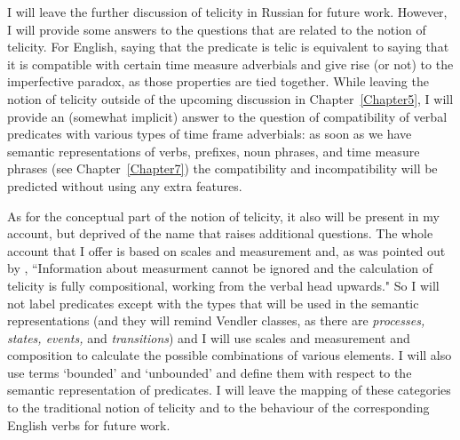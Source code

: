  
 
I will leave the further discussion of telicity in Russian for future work. However, I will provide some answers to the questions that are related to the notion of telicity. For English, saying that the predicate is telic is equivalent to saying that it is compatible with certain time measure adverbials and give rise (or not) to the imperfective paradox, as those properties are tied together. While leaving the notion of telicity outside of the upcoming discussion in Chapter~\ref{Chapter5}, I will provide an (somewhat implicit) answer to the question of compatibility of verbal predicates with various types of time frame adverbials: as soon as we have semantic representations of verbs, prefixes, noun phrases, and time measure phrases (see Chapter~\ref{Chapter7}) the compatibility and incompatibility will be predicted without using any extra features.

As for the conceptual part of the notion of telicity, it also will be present in my account, but deprived of the name that raises additional questions. The whole account that I offer is based on scales and measurement and, as was pointed out by \citet[60]{Rothstein:08}, ``Information about measurment cannot be ignored and the calculation of telicity is fully compositional, working from the verbal head upwards." So I will not label predicates except with the types that will be used in the semantic representations (and they will remind Vendler classes, as there are \textit{processes, states, events,} and \textit{transitions}) and I will use scales and measurement and composition to calculate the possible combinations of various elements. I will also use terms `bounded' and `unbounded' and define them with respect to the semantic representation of predicates. I will leave the mapping of these categories to the traditional notion of telicity and to the behaviour of the corresponding English verbs for future work.
 
